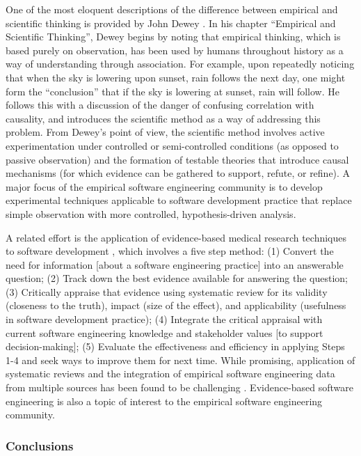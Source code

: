 One of the most eloquent descriptions of the difference between empirical
and scientific thinking is provided by John Dewey \citep{Dewey10}.  In his
chapter ``Empirical and Scientific Thinking'', Dewey begins by noting that
empirical thinking, which is based purely on observation, has been used by
humans throughout history as a way of understanding through association.
For example, upon repeatedly noticing that when the sky is lowering upon
sunset, rain follows the next day, one might form the ``conclusion'' that
if the sky is lowering at sunset, rain will follow.  He follows this with a
discussion of the danger of confusing correlation with causality, and
introduces the scientific method as a way of addressing this problem.  From
Dewey's point of view, the scientific method involves active
experimentation under controlled or semi-controlled conditions (as opposed
to passive observation) and the formation of testable theories that
introduce causal mechanisms (for which evidence can be gathered to support,
refute, or refine).  A major focus of the empirical software engineering
community is to develop experimental techniques applicable to software
development practice that replace simple observation with more controlled,
hypothesis-driven analysis.

A related effort is the application of evidence-based medical research
techniques to software development \citep{Kitchenham04,Kitchenham04a},
which involves a five step method: (1) Convert the need for information
[about a software engineering practice] into an answerable question; (2)
Track down the best evidence available for answering the question; (3)
Critically appraise that evidence using systematic review for its validity
(closeness to the truth), impact (size of the effect), and applicability
(usefulness in software development practice); (4) Integrate the critical
appraisal with current software engineering knowledge and stakeholder
values [to support decision-making]; (5) Evaluate the effectiveness and
efficiency in applying Steps 1-4 and seek ways to improve them for next
time.  While promising, application of systematic reviews and the
integration of empirical software engineering data from multiple sources
has been found to be challenging \citep{Jedlitschka04}.  Evidence-based
software engineering is also a topic of interest to the empirical software
engineering community.


\subsubsection{Conclusions}

